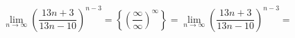 \documentclass[../rgr1.tex]{subfiles}
\begin{document}
\Solution

\begin{equation}
	\lim_{n\to\infty}\left( \frac{13n+3}{13n-10} \right)^{n-3} =
	\left\{ \left( \frac{\infty}{\infty} \right)^{\infty} \right\} =
	\lim_{n\to\infty}\left( \frac{13n+3}{13n-10} \right)^{n-3} =
\end{equation}

\end{document}

